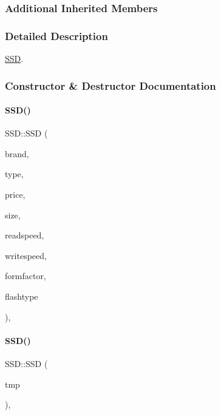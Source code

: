 \subsubsection*{Additional Inherited Members}


\subsubsection{Detailed Description}
\mbox{\hyperlink{class_s_s_d}{S\+SD}}. 

\subsubsection{Constructor \& Destructor Documentation}
\mbox{\label{class_s_s_d_a1e80104276b02f8ca6f016f41a2a5f41}} 
\paragraph{\texorpdfstring{SSD()}{SSD()}\hspace{0.1cm}{\footnotesize\ttfamily [1/2]}}
{\footnotesize\ttfamily S\+S\+D\+::\+S\+SD (\begin{DoxyParamCaption}\item[{\mbox{\hyperlink{class_string}{String}}}]{brand,  }\item[{\mbox{\hyperlink{class_string}{String}}}]{type,  }\item[{int}]{price,  }\item[{int}]{size,  }\item[{int}]{readspeed,  }\item[{int}]{writespeed,  }\item[{\mbox{\hyperlink{class_string}{String}}}]{formfactor,  }\item[{\mbox{\hyperlink{class_string}{String}}}]{flashtype }\end{DoxyParamCaption})\hspace{0.3cm}{\ttfamily [inline]}, {\ttfamily [explicit]}}

\mbox{\label{class_s_s_d_a21d101c62d384539899d6af07baa4a83}} 
\paragraph{\texorpdfstring{SSD()}{SSD()}\hspace{0.1cm}{\footnotesize\ttfamily [2/2]}}
{\footnotesize\ttfamily S\+S\+D\+::\+S\+SD (\begin{DoxyParamCaption}\item[{\mbox{\hyperlink{struct_temp_input}{Temp\+Input}} \&}]{tmp }\end{DoxyParamCaption})\hspace{0.3cm}{\ttfamily [inline]}, {\ttfamily [explicit]}}



